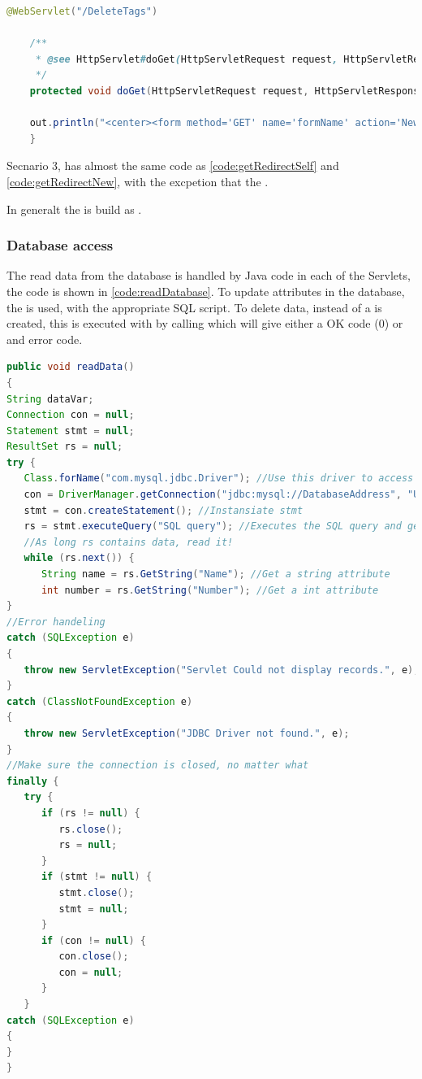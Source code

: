 \begin{lstlisting}[language=Java,label=code:getRedirectNew,caption=A form which redirect to its own get method]
	@WebServlet("/DeleteTags")
	
	/**
	 * @see HttpServlet#doGet(HttpServletRequest request, HttpServletResponse response)
	 */
	protected void doGet(HttpServletRequest request, HttpServletResponse response) throws ServletException, IOException {
	
	out.println("<center><form method='GET' name='formName' action='NewPage'>");
	}
\end{lstlisting}

Secnario 3, has almost the same code as \autoref{code:getRedirectSelf} and \autoref{code:getRedirectNew}, with the excpetion that the .

In generalt the  is build as .

\subsubsection{Database access}
The read data from the database is handled by Java code in each of the Servlets, the code is shown in \autoref{code:readDatabase}. To update attributes in the database, the  is used, with the appropriate SQL script.  To delete data, instead of  a  is created, this is executed with by calling  which will give either a OK code (0) or and error code. 

\begin{lstlisting}[language=Java,label=code:readDatabase,caption=Code to read data from the database]
public void readData()
{
String dataVar;
Connection con = null;
Statement stmt = null;
ResultSet rs = null;
try {
   Class.forName("com.mysql.jdbc.Driver"); //Use this driver to access the database
   con = DriverManager.getConnection("jdbc:mysql://DatabaseAddress", "Username", "Password"); //Instansiate the connection
   stmt = con.createStatement(); //Instansiate stmt
   rs = stmt.executeQuery("SQL query"); //Executes the SQL query and get the result store in RS
   //As long rs contains data, read it!
   while (rs.next()) { 
      String name = rs.GetString("Name"); //Get a string attribute
      int number = rs.GetString("Number"); //Get a int attribute
}
//Error handeling
catch (SQLException e) 
{		
   throw new ServletException("Servlet Could not display records.", e);
} 
catch (ClassNotFoundException e) 
{			
   throw new ServletException("JDBC Driver not found.", e);
}
//Make sure the connection is closed, no matter what 
finally {
   try {
      if (rs != null) {
         rs.close();
         rs = null;
      }
      if (stmt != null) {
         stmt.close();
         stmt = null;
      }
      if (con != null) {
         con.close();
         con = null;
      }
   } 
catch (SQLException e) 
{			
}
}

\end{lstlisting}

